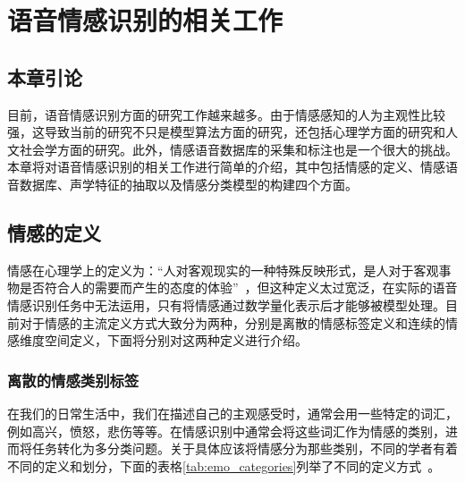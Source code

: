 \chapter{语音情感识别的相关工作}
\label{cha:basic_konwledge}

\section{本章引论}
\label{sec:basic_konwledge_intro}
目前，语音情感识别方面的研究工作越来越多。由于情感感知的人为主观性比较强，这导致当前的研究不只是模型算法方面的研究，还包括心理学方面的研究和人文社会学方面的研究。此外，情感语音数据库的采集和标注也是一个很大的挑战。本章将对语音情感识别的相关工作进行简单的介绍，其中包括情感的定义、情感语音数据库、声学特征的抽取以及情感分类模型的构建四个方面。

\section{情感的定义}
\label{sec:emo_def}
情感在心理学上的定义为：“人对客观现实的一种特殊反映形式，是人对于客观事物是否符合人的需要而产生的态度的体验”~\cite{Van1983Recognition}，但这种定义太过宽泛，在实际的语音情感识别任务中无法运用，只有将情感通过数学量化表示后才能够被模型处理。目前对于情感的主流定义方式大致分为两种，分别是离散的情感标签定义和连续的情感维度空间定义，下面将分别对这两种定义进行介绍。

\subsection{离散的情感类别标签}
\label{ssec:discrete_label}
在我们的日常生活中，我们在描述自己的主观感受时，通常会用一些特定的词汇，例如高兴，愤怒，悲伤等等。在情感识别中通常会将这些词汇作为情感的类别，进而将任务转化为多分类问题。关于具体应该将情感分为那些类别，不同的学者有着不同的定义和划分，下面的表格\ref{tab:emo_categories}列举了不同的定义方式~\cite{Ortony1990What, Robinson2013Handbook}。

